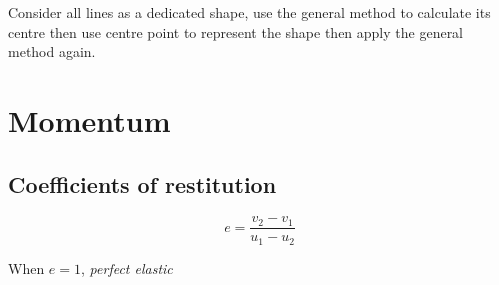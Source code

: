 \documentclass[a4paper,9pt]{scrartcl}
\begin{document}
    Consider all lines as a dedicated shape, use the general method to calculate its centre then use centre point to represent the shape then apply the general method again.


    \section{Momentum}

    \subsection{Coefficients of restitution}

    \begin{displaymath}
        e = \frac{v_2-v_1}{u_1-u_2}
    \end{displaymath}

    When $e=1$, \textit{perfect elastic}
\end{document}
